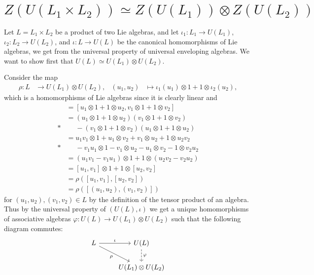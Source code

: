 \section{\texorpdfstring{$Z(U(L_1\times L_2))\simeq Z(U(L_1))\otimes Z(U(L_2))$}{Z(U(L\_1 x L\_2)) is isomorphic to Z(U(L\_1)) tensor Z(U(L\_2))}}\label{sec:centeriso}

Let $L=L_1\times L_2$ be a product of two Lie algebras, and let $\iota_1\colon L_1\to U(L_1)$, $\iota_2\colon L_2\to U(L_2)$, and $\iota\colon L\to U(L)$ be the canonical homomorphisms of Lie algebras, we get from the universal property of universal enveloping algebras. We want to show first that $U(L)\simeq U(L_1)\otimes U(L_2)$.

Consider the map
\begin{align*}
  \rho\colon L &\to U(L_1)\otimes U(L_2), & (u_1,u_2)&\mapsto \iota_1(u_1)\otimes 1 + 1\otimes \iota_2(u_2),
\end{align*}
which is a homomorphisms of Lie algebras since it is clearly linear and
\begin{align*}
  [\rho(u_1,u_2),\rho(v_1,v_2)] &= [u_1\otimes 1 + 1\otimes u_2, v_1\otimes 1 + 1\otimes v_2] \\
                                &= (u_1\otimes 1+1\otimes u_2)(v_1\otimes 1 + 1\otimes v_2) \\*
                                &\phantom{{}={}}{} - (v_1\otimes 1 + 1\otimes v_2)(u_1\otimes 1 + 1\otimes u_2) \\
                                &= u_1v_1\otimes 1 + u_1\otimes v_2 + v_1\otimes u_2 + 1\otimes u_2v_2 \\*
                                &\phantom{{}={}}{} - v_1u_1\otimes 1 - v_1\otimes u_2 - u_1\otimes v_2 - 1\otimes v_2u_2 \\
                                &= (u_1v_1-v_1u_1)\otimes 1 + 1\otimes (u_2v_2-v_2u_2) \\
                                &= [u_1,v_1]\otimes 1 + 1\otimes [u_2,v_2] \\
                                &= \rho([u_1,v_1],[u_2,v_2]) \\
                                &= \rho([(u_1,u_2),(v_1,v_2)])
\end{align*}
for $(u_1,u_2),(v_1,v_2)\in L$ by the definition of the tensor product of an algebra. Thus by the universal property of $(U(L),\iota)$ we get a unique homomorphisms of associative algebras $\varphi\colon U(L)\to U(L_1)\otimes U(L_2)$ such that the following diagram commutes:
\[
  \begin{tikzcd}
    L \ar[r,"\iota"]\ar[dr,"\rho",swap] & U(L)\ar[d,dashed,"\varphi"] \\
    & U(L_1)\otimes U(L_2)
  \end{tikzcd}
\]

